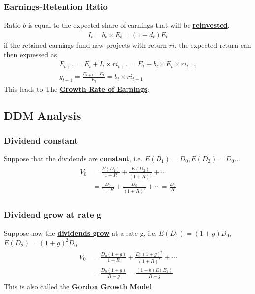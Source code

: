 \begin{multicols}{2}
\subsubsection{Earnings-Retention Ratio}
Ratio $b$ is equal to the expected share of earnings that will be \underline{\textbf{reinvested}}.
\begin{gather*}
    I_t = b_t\times E_t = (1-d_t)E_t
\end{gather*}
if the retained earnings fund new projects with return $ri$. the expected return can then expressed as
\begin{gather*}
    E_{t+1} = E_t + I_t\times ri_{t+1} = E_t+b_t\times E_t\times ri_{t+1}\\
    \boxed{g_{t+1}=\frac{E_{t+1}-E_t}{E_t} = b_t\times ri_{t+1}}
\end{gather*}
This leads to The \underline{\textbf{Growth Rate of Earnings}}:

\subsection{DDM Analysis}
\subsubsection{Dividend constant}
Suppose that the dividends are \underline{\textbf{constant}}, i.e. $E(D_1) = D_0, E(D_2) = D_0...$
\begin{gather*}
    \begin{split}
        V_0 &= \frac{E(D_1)}{1+R} + \frac{E(D_2)}{(1+R)^2}+\cdots\\
        &= \frac{D_0}{1+R} + \frac{D_0}{(1+R)^2}+\cdots = \boxed{\frac{D_0}{R}}
    \end{split}
\end{gather*}
\subsubsection{Dividend grow at rate g}
Suppose now the \underline{\textbf{dividends grow}} at a rate g, i.e. $E(D_1) = (1+g)D_0$, $E(D_2) = (1+g)^2D_0$
\begin{gather*}
    \begin{split}
        V_0 &= \frac{D_0(1+g)}{1+R}+\frac{D_0(1+g)^2}{(1+R)^2}+\cdots\\
        &= \frac{D_0(1+g)}{R-g} = \boxed{\frac{(1-b)E(E_1)}{R-g}}
    \end{split}
\end{gather*}
This is also called the \underline{\textbf{Gordon Growth Model}}\par 


\end{multicols}
